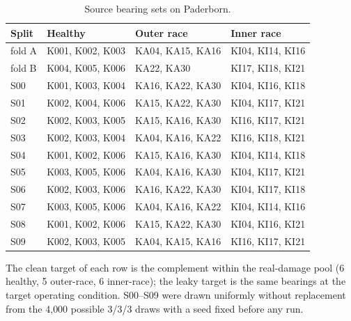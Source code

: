 \begin{table}[htbp]
\centering
\caption{Source bearing sets on Paderborn.}
\label{tab:splits}
\small
\setlength{\tabcolsep}{4pt}
\begin{tabular}{llll}
\toprule
Split & Healthy & Outer race & Inner race \\
\midrule
fold A & K001, K002, K003 & KA04, KA15, KA16 & KI04, KI14, KI16 \\
fold B & K004, K005, K006 & KA22, KA30 & KI17, KI18, KI21 \\
\midrule
S00 & K001, K003, K004 & KA16, KA22, KA30 & KI04, KI16, KI18 \\
S01 & K002, K004, K006 & KA15, KA22, KA30 & KI04, KI17, KI21 \\
S02 & K002, K003, K005 & KA15, KA16, KA30 & KI16, KI17, KI21 \\
S03 & K002, K003, K004 & KA04, KA16, KA22 & KI16, KI18, KI21 \\
S04 & K001, K002, K006 & KA15, KA16, KA30 & KI04, KI14, KI18 \\
S05 & K003, K005, K006 & KA04, KA16, KA30 & KI04, KI17, KI21 \\
S06 & K002, K003, K006 & KA16, KA22, KA30 & KI04, KI17, KI18 \\
S07 & K003, K005, K006 & KA04, KA16, KA22 & KI04, KI14, KI16 \\
S08 & K001, K002, K006 & KA15, KA22, KA30 & KI04, KI16, KI21 \\
S09 & K002, K003, K005 & KA04, KA15, KA16 & KI16, KI17, KI21 \\
\bottomrule
\end{tabular}
\begin{minipage}{\linewidth}\vspace{2pt}\footnotesize The clean target of each row is the complement within the real-damage pool (6 healthy, 5 outer-race, 6 inner-race); the leaky target is the same bearings at the target operating condition. S00--S09 were drawn uniformly without replacement from the 4{,}000 possible 3/3/3 draws with a seed fixed before any run.\end{minipage}
\end{table}

